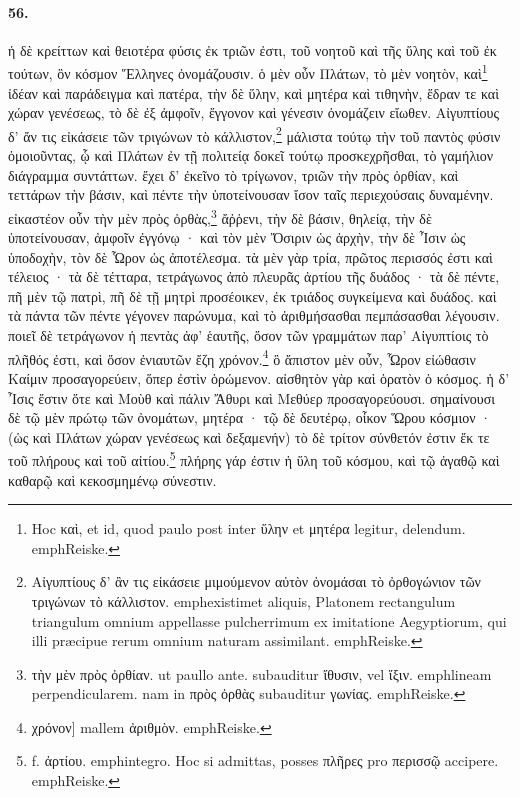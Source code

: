\documentclass[a4paper, 11pt, oneside, polutonikogreek, german]{article}
\begin{document}
\paragraph{56.}
ἡ δὲ κρείττων καὶ θειοτέρα φύσις ἐκ τριῶν ἐστι, τοῦ νοητοῦ καὶ τῆς ὕλης καὶ τοῦ ἐκ τούτων, ὃν κόσμον Ἕλληνες ὀνομάζουσιν. ὁ μὲν οὖν Πλάτων, τὸ μὲν νοητὸν, καὶ\footnote{Hoc καὶ, et id, quod paulo post inter ὕλην et μητέρα legitur, delendum. emph{Reiske.}} ἰδέαν καὶ παράδειγμα καὶ πατέρα, τὴν δὲ ὕλην, καὶ μητέρα καὶ τιθηνὴν, ἕδραν τε καὶ χώραν γενέσεως, τὸ δὲ ἐξ ἀμφοῖν, ἔγγονον καὶ γένεσιν ὀνομάζειν εἴωθεν. Αἰγυπτίους δ' ἄν τις εἰκάσειε τῶν τριγώνων τὸ κάλλιστον,\footnote{Αἰγυπτίους δ' ἂν τις εἰκάσειε μιμούμενον αὐτὸν ὀνομάσαι τὸ ὀρθογώνιον τῶν τριγώνων τὸ κάλλιστον. emph{existimet aliquis, Platonem rectangulum triangulum omnium appellasse pulcherrimum ex imitatione Aegyptiorum, qui illi præcipue rerum omnium naturam assimilant.} emph{Reiske.}} μάλιστα τούτῳ τὴν τοῦ παντὸς φύσιν ὁμοιοῦντας, ᾧ καὶ Πλάτων ἐν τῇ πολιτείᾳ δοκεῖ τούτῳ προσκεχρῆσθαι, τὸ γαμήλιον διάγραμμα συντάττων. ἔχει δ' ἐκεῖνο τὸ τρίγωνον, τριῶν τὴν πρὸς ὀρθίαν, καὶ τεττάρων τὴν βάσιν, καὶ πέντε τὴν ὑποτείνουσαν ἴσον ταῖς περιεχούσαις δυναμένην. εἰκαστέον οὖν τὴν μὲν πρὸς ὀρθὰς,\footnote{τὴν μὲν πρὸς ὀρθίαν. ut paullo ante. subauditur ἴθυσιν, vel ἴξιν. emph{lineam perpendicularem.} nam in πρὸς ὀρθὰς subauditur γωνίας. emph{Reiske.} } ἄῤῥενι, τὴν δὲ βάσιν, θηλείᾳ, τὴν δὲ ὑποτείνουσαν, ἀμφοῖν ἐγγόνῳ · καὶ τὸν μὲν Ὄσιριν ὡς ἀρχὴν, τὴν δὲ Ἶσιν ὡς ὑποδοχὴν, τὸν δὲ Ὧρον ὡς ἀποτέλεσμα. τὰ μὲν γὰρ τρία, πρῶτος περισσός ἐστι καὶ τέλειος · τὰ δὲ τέτταρα, τετράγωνος ἀπὸ πλευρᾶς ἀρτίου τῆς δυάδος · τὰ δὲ πέντε, πῆ μὲν τῷ πατρὶ, πῆ δὲ τῇ μητρὶ προσέοικεν, ἐκ τριάδος συγκείμενα καὶ δυάδος. καὶ τὰ πάντα τῶν πέντε γέγονεν παρώνυμα, καὶ τὸ ἀριθμήσασθαι πεμπάσασθαι λέγουσιν. ποιεῖ δὲ τετράγωνον ἡ πεντὰς ἀφ' ἑαυτῆς, ὅσον τῶν γραμμάτων παρ' Αἰγυπτίοις τὸ πλῆθός ἐστι, καὶ ὅσον ἐνιαυτῶν ἔζη χρόνον.\footnote{χρόνον] mallem ἀριθμὸν. emph{Reiske.}} ὃ ἄπιστον μὲν οὖν, Ὧρον εἰώθασιν Καίμιν προσαγορεύειν, ὅπερ ἐστὶν ὁρώμενον. αἰσθητὸν γὰρ καὶ ὁρατὸν ὁ κόσμος. ἡ δ' Ἶσις ἔστιν ὅτε καὶ Μοὺθ καὶ πάλιν Ἄθυρι καὶ Μεθύερ προσαγορεύουσι. σημαίνουσι δὲ τῷ μὲν πρώτῳ τῶν ὀνομάτων, μητέρα · τῷ δὲ δευτέρῳ, οἶκον Ὥρου κόσμιον · (ὡς καὶ Πλάτων χώραν γενέσεως καὶ δεξαμενήν) τὸ δὲ τρίτον σύνθετόν ἐστιν ἔκ τε τοῦ πλήρους καὶ τοῦ αἰτίου.\footnote{f. ἀρτίου. emph{integro.} Hoc si admittas, posses πλῆρες pro περισσῷ accipere. emph{Reiske.}} πλήρης γάρ ἐστιν ἡ ὕλη τοῦ κόσμου, καὶ τῷ ἀγαθῷ καὶ καθαρῷ καὶ κεκοσμημένῳ σύνεστιν.
\end{document}

